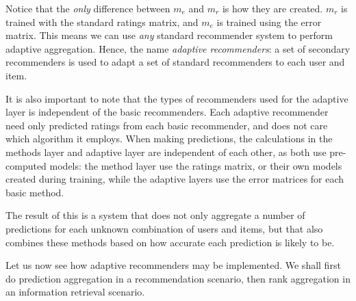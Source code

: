 Notice that the \emph{only} difference between $m_e$ and $m_r$ is how they are created.
$m_r$ is trained with the standard ratings matrix, and $m_e$ is trained using the error matrix.
This means we can use \emph{any} standard recommender system to perform adaptive aggregation.
Hence, the name \emph{adaptive recommenders}:
a set of secondary recommenders is used to adapt a set of standard
recommenders to each user and item.

It is also important to note that the types of recommenders used for the adaptive layer
is independent of the basic recommenders.
Each adaptive recommender need only predicted ratings from each basic recommender,
and does not care which algorithm it employs.
When making predictions, the calculations in the methods layer and adaptive layer
are independent of each other, as both use pre-computed models:
the method layer use the ratings matrix, or their own models
created during training, while the adaptive layers use the error matrices for each
basic method.

The result of this is a system that does not only aggregate a number of predictions for each unknown
combination of users and items,
but that also combines these methods based on how accurate each prediction is likely to be.

Let us now see how adaptive recommenders may be implemented.
We shall first do prediction aggregation in a recommendation scenario,
then rank aggregation in an information retrieval scenario.

